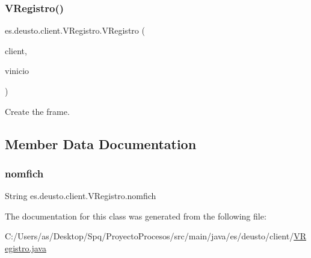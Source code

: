 \subsubsection{\texorpdfstring{VRegistro()}{VRegistro()}}
{\footnotesize\ttfamily es.\+deusto.\+client.\+V\+Registro.\+V\+Registro (\begin{DoxyParamCaption}\item[{\mbox{\hyperlink{classes_1_1deusto_1_1client_1_1_client}{Client}}}]{client,  }\item[{\mbox{\hyperlink{classes_1_1deusto_1_1client_1_1_v_inicio}{V\+Inicio}}}]{vinicio }\end{DoxyParamCaption})}

Create the frame. 

\subsection{Member Data Documentation}
\mbox{\label{classes_1_1deusto_1_1client_1_1_v_registro_aaed4b25a7461d8f707107022b6c9b6e6}} 
\subsubsection{\texorpdfstring{nomfich}{nomfich}}
{\footnotesize\ttfamily String es.\+deusto.\+client.\+V\+Registro.\+nomfich\hspace{0.3cm}{\ttfamily [static]}}



The documentation for this class was generated from the following file\+:\begin{DoxyCompactItemize}
\item 
C\+:/\+Users/as/\+Desktop/\+Spq/\+Proyecto\+Procesos/src/main/java/es/deusto/client/\mbox{\hyperlink{_v_registro_8java}{V\+Registro.\+java}}\end{DoxyCompactItemize}
